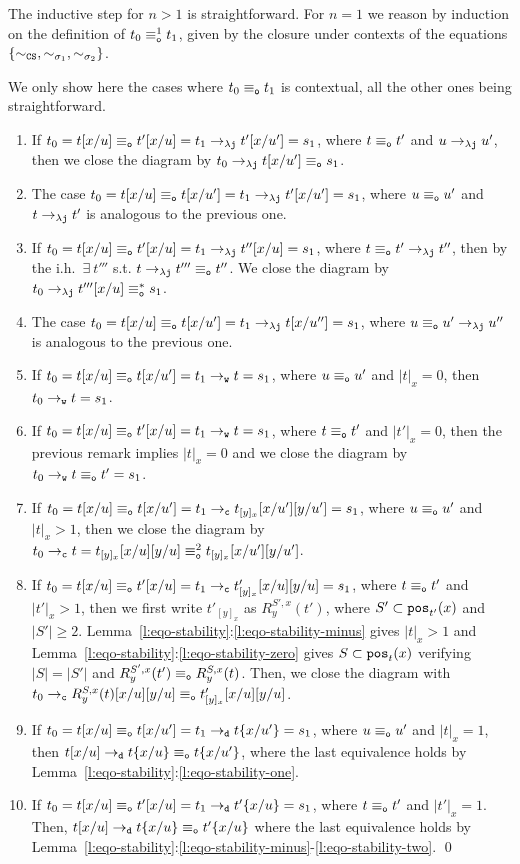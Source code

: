 \documentclass{LMCS}
\renewcommand{\>}{\rightarrow}
\def\lam{\lambda}
\def\sig{\sigma}
\newcommand{\Rew}[1]{\rightarrow_{#1}}
\newcommand{\isubs}[1]{ \{ #1  \} }
\newcommand{\pos}[2]{{\tt pos}_{#1}(#2)}
\newcommand{\dis}{{\tt j}}
\newcommand{\ldis}{\lam{\dis}}
\newcommand{\ren}[4]{R^{#2, #3}_{#4}(#1)}
\newcommand{\Var}{{\tt d}}
\newcommand{\DSubs}{{\tt c}}
\newcommand{\Gc}{{\tt w}}
\newcommand{\CS}{{\tt CS}}
\newcommand{\set}[1]{ \{ #1 \}}
\newcommand{\ih}{i.h.}
\newcommand{\eqo}{\equiv_\osym}
\newcommand{\osym}{{\tt o}}
\begin{document}
The inductive step for $n> 1$ is straightforward. For 
 $n=1$ we reason by induction on the definition of
$t_0\eqo^1 t_1$, given by the closure under contexts of the equations
$\set{\sim_{\CS}, \sim_{\sig_1}, \sim_{\sig_2}}$.
 


We only show here the cases where $t_0 \eqo t_1$ is contextual, all the other ones being straightforward. 
\begin{enumerate}[$\bullet$]
\item If $t_0=t [x/u]\eqo t' [x/u]=t_1\Rew{\ldis} t' [x/u']=s_1 $,
where $t \eqo t'$ and $u \Rew{\ldis} u'$,  then we close the diagram by $t_0  \Rew{\ldis} t [x/u'] \eqo s_1$. 
\item The case $t_0=t [x/u]\eqo t [x/u']=t_1\Rew{\ldis} t' [x/u']=s_1 $,
where $u \eqo u'$ and $t \Rew{\ldis} t'$ is analogous to the previous  one.
\item If $t_0=t [x/u]\eqo t' [x/u]=t_1\Rew{\ldis} t'' [x/u]=s_1 $, 
where $t \eqo t' \Rew{\ldis} t''$, then by the \ih\ $\exists\ t'''$ s.t. $t\Rew{\ldis}t''' \eqo t''$. 
We close the diagram by  $t_0\Rew{\ldis}t''' [x/u]  \eqo^* s_1$.
\item The case $t_0=t [x/u]\eqo t [x/u']=t_1\Rew{\ldis} t [x/u'']=s_1 $,
where $u \eqo u' \Rew{\ldis} u''$ is analogous to the previous one.
\item If $t_0=t [x/u]\eqo t [x/u']=t_1\Rew{\Gc} t=s_1$, where
$u \eqo u'$ and $|t|_x=0$,  then $t_0\Rew{\Gc} t=s_1$.
\item If $t_0=t [x/u]\eqo t' [x/u]=t_1\Rew{\Gc} t=s_1$, where 
      $t \eqo t'$ and $|t'|_x=0$,  then the previous remark implies
      $|t|_x =0$ and we close the diagram by  $t_0\Rew{\Gc} t\eqo t'=s_1$.
\item If $t_0=t [x/u]\eqo t [x/u']=t_1\Rew{\DSubs}
  t_{[y]_x}[x/u'][y/u']=s_1$, where $u \eqo u'$ and $|t|_x >1$, then we
  close the diagram by $t_0\Rew{\DSubs} t=t_{[y]_x}[x/u][y/u] \eqo^2
  t_{[y]_x}[x/u'][y/u']$.
\item  If $t_0=t [x/u]\eqo t' [x/u]=t_1\Rew{\DSubs}
  t'_{[y]_x}[x/u][y/u]=s_1$, where $t \eqo t'$ and $|t'|_x >1$, then
  we first write $t'_{[y]_x}$ as $\ren{t'}{S'}{x}{y}$, where
  $S' \subset \pos{t'}{x}$ and $|S'| \geq 2$.
  Lemma~\ref{l:eqo-stability}:\ref{l:eqo-stability-minus}
  gives
  $|t|_x >1$ and Lemma~\ref{l:eqo-stability}:\ref{l:eqo-stability-zero}
  gives $S \subset \pos{t}{x}$ verifying $|S| = |S'|$ and 
  $\ren{t'}{S'}{x}{y} \eqo \ren{t}{S}{x}{y}$. 
  Then, we close the diagram with
  $t_0\Rew{\DSubs} \ren{t}{S}{x}{y}[x/u][y/u]\eqo
  t'_{[y]_x}[x/u][y/u]$.
\item If $t_0=t [x/u]\eqo t [x/u']=t_1\Rew{\Var}
  t\isubs{x/u'}=s_1$, where $u \eqo u'$ and $|t|_x=1$, then  $t [x/u]\Rew{\Var}
  t\isubs{x/u}\eqo t\isubs{x/u'}$,  where the last equivalence 
  holds by Lemma~\ref{l:eqo-stability}:\ref{l:eqo-stability-one}.
\item If $t_0=t[x/u]\eqo t'[x/u]=t_1\Rew{\Var} t'\isubs{x/u}=s_1$,
  where $t \eqo t'$ and $|t'|_x =1$. Then, $t [x/u]\Rew{\Var}
  t\isubs{x/u}\eqo t'\isubs{x/u}$ where the last equivalence holds by
  Lemma~\ref{l:eqo-stability}:\ref{l:eqo-stability-minus}-\ref{l:eqo-stability-two}.
\qed\medskip
\end{enumerate}
\end{document}
